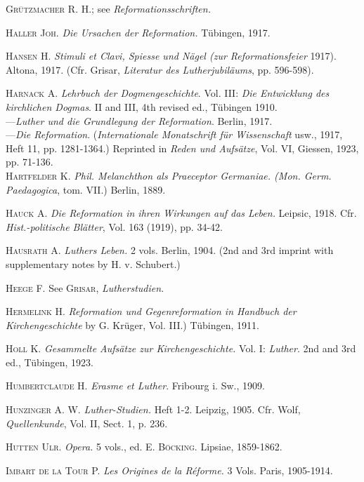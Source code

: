 \textsc{Grützmacher R. H.}; see \textit{Reformationsschriften.}

\textsc{Haller Joh.} \textit{Die Ursachen der Reformation.} Tübingen, 1917.

\textsc{Hansen H.} \textit{Stimuli et Clavi, Spiesse und Nägel (zur Reformationsfeier} 1917).
Altona, 1917. (Cfr. Grisar, \textit{Literatur des Lutherjubiläums}, pp. 596-598).

\textsc{Harnack A.} \textit{Lehrbuch der Dogmengeschichte}. Vol. III: \textit{Die Entwicklung
des kirchlichen Dogmas}. II and III, 4th revised ed., Tübingen 1910. \\
---\textit{Luther und die Grundlegung der Reformation}. Berlin, 1917. \\
---\textit{Die Reformation}. (\textit{Internationale Monatschrift für Wissenschaft} usw.,
1917, Heft 11, pp. 1281-1364.) Reprinted in \textit{Reden und Aufsätze}, Vol.
VI, Giessen, 1923, pp. 71-136. \\

\textsc{Hartfelder K.} \textit{Phil. Melanchthon als Praeceptor Germaniae. (Mon. Germ.
Paedagogica}, tom. VII.) Berlin, 1889.

\textsc{Hauck A.} \textit{Die Reformation in ihren Wirkungen auf das Leben.} Leipsic,
1918. Cfr. \textit{Hist.-politische Blätter}, Vol. 163 (1919), pp. 34-42.

\textsc{Hausrath A.} \textit{Luthers Leben.} 2 vols. Berlin, 1904. (2nd and 3rd imprint
with supplementary notes by H. v. Schubert.)

\textsc{Heege F.} See \textsc{Grisar}, \textit{Lutherstudien.}

\textsc{Hermelink H.} \textit{Reformation und Gegenreformation in Handbuch der
Kirchengeschichte} by G. Krüger, Vol. III.) Tübingen, 1911.

\textsc{Holl K.} \textit{Gesammelte Aufsätze zur Kirchengeschichte.} Vol. I: \textit{Luther}. 2nd
and 3rd ed., Tübingen, 1923.

\textsc{Humbertclaude H.} \textit{Erasme et Luther}. Fribourg i. Sw., 1909.

\textsc{Hunzinger A. W.} \textit{Luther-Studien.} Heft 1-2. Leipzig, 1905. Cfr. Wolf,
\textit{Quellenkunde}, Vol. II, Sect. 1, p. 236.

\textsc{Hutten Ulr.} \textit{Opera.} 5 vols., ed. \textsc{E. Böcking.} Lipsiae, 1859-1862.

\textsc{Imbart de la Tour P.} \textit{Les Origines de la Réforme.} 3 Vols. Paris, 1905-1914.

